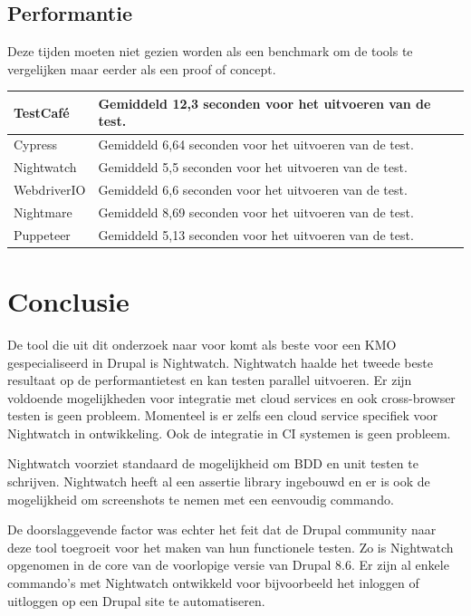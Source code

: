 \subsection{Performantie}

Deze tijden moeten niet gezien worden als een benchmark om de \glspl{tool} te vergelijken maar eerder als een proof of concept.

\begin{tabular}{ | l | p{12cm} | }
\hline
 TestCafé & Gemiddeld 12,3 seconden voor het uitvoeren van de test.\\
\hline
 Cypress & Gemiddeld 6,64 seconden voor het uitvoeren van de test.\\
\hline
 Nightwatch & Gemiddeld 5,5 seconden voor het uitvoeren van de test. \\
\hline
 WebdriverIO & Gemiddeld 6,6 seconden voor het uitvoeren van de test.\\
\hline
 Nightmare & Gemiddeld 8,69 seconden voor het uitvoeren van de test.\\
\hline
 Puppeteer & Gemiddeld 5,13 seconden voor het uitvoeren van de test.\\
\hline
\end{tabular}

\clearpage
\section{Conclusie}
De \gls{tool} die uit dit onderzoek naar voor komt als beste voor een \gls{KMO} gespecialiseerd in Drupal is Nightwatch. Nightwatch haalde het tweede beste resultaat op de performantietest en kan testen parallel uitvoeren. Er zijn voldoende mogelijkheden voor integratie met cloud services en ook cross-browser testen is geen probleem. Momenteel is er zelfs een cloud service specifiek voor Nightwatch in ontwikkeling. Ook de integratie in \gls{CI} systemen is geen probleem.

Nightwatch voorziet standaard de mogelijkheid om \gls{BDD} en unit testen te schrijven. Nightwatch heeft al een \gls{assertie} \gls{library} ingebouwd en er is ook de mogelijkheid om screenshots te nemen met een eenvoudig commando.

De doorslaggevende factor was echter het feit dat de Drupal community naar deze \gls{tool} toegroeit voor het maken van hun functionele testen. Zo is Nightwatch opgenomen in de core van de voorlopige versie van Drupal 8.6. Er zijn al enkele commando's met Nightwatch ontwikkeld voor bijvoorbeeld het inloggen of uitloggen op een Drupal site te automatiseren.



